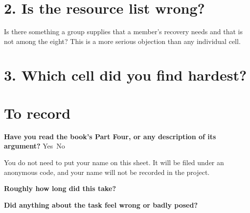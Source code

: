 \documentclass[11pt]{article}
\begin{document}
\section{2. Is the resource list wrong?}
Is there something a group supplies that a member's recovery needs and that is not among the
eight? This is a more serious objection than any individual cell.
\answerlines[6]

\section{3. Which cell did you find hardest?}
\answerlines[6]

\section{To record}

\textbf{Have you read the book's Part Four, or any description of its argument?} \quad
Yes~\checkbox \qquad No~\checkbox

\smallskip
You do not need to put your name on this sheet. It will be filed under an anonymous code, and your
name will not be recorded in the project.

\smallskip
\textbf{Roughly how long did this take?} \answerlines[1]

\smallskip
\textbf{Did anything about the task feel wrong or badly posed?}
\answerlines[5]
\end{document}
